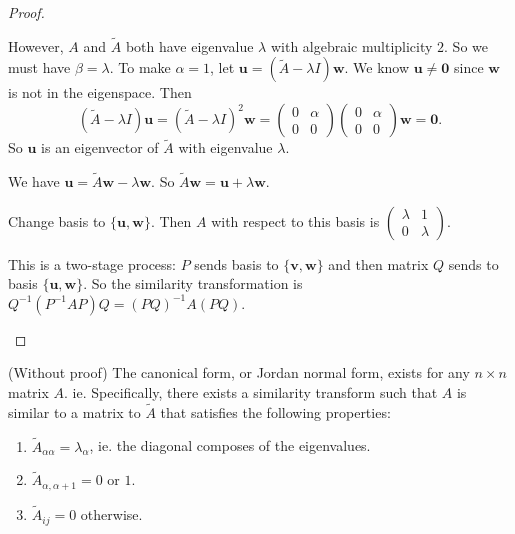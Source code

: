 \documentclass[a4paper]{article}
\begin{document}
\begin{proof}
\begin{enumerate}
      However, $A$ and $\tilde{A}$ both have eigenvalue $\lambda$ with algebraic multiplicity $2$. So we must have $\beta = \lambda$. To make $\alpha = 1$, let $\mathbf{u} = (\tilde{A} - \lambda I)\mathbf{w}$. We know $\mathbf{u}\not= \mathbf{0}$ since $\mathbf{w}$ is not in the eigenspace. Then
      \[
        (\tilde{A} - \lambda I)\mathbf{u} = (\tilde{A} - \lambda I)^2 \mathbf{w} =
        \begin{pmatrix}
          0 & \alpha\\
          0 & 0
        \end{pmatrix}
        \begin{pmatrix}
          0 & \alpha\\
          0 & 0
        \end{pmatrix}\mathbf{w} = \mathbf{0}.
      \]
      So $\mathbf{u}$ is an eigenvector of $\tilde{A}$ with eigenvalue $\lambda$.

      We have $\mathbf{u} = \tilde A\mathbf{w} - \lambda\mathbf{w}$. So $\tilde A\mathbf{w} = \mathbf{u} + \lambda\mathbf{w}$.

      Change basis to $\{\mathbf{u}, \mathbf{w}\}$. Then $A$ with respect to this basis is $
      \begin{pmatrix}
        \lambda & 1\\
        0 & \lambda
      \end{pmatrix}$.

      This is a two-stage process: $P$ sends basis to $\{\mathbf{v}, \mathbf{w}\}$ and then matrix $Q$ sends to basis $\{\mathbf{u}, \mathbf{w}\}$. So the similarity transformation is $Q^{-1}(P^{-1}AP)Q = (PQ)^{-1}A(PQ)$.
  \end{enumerate}
\end{proof}

\begin{prop}
  (Without proof) The canonical form, or Jordan normal form, exists for any $n\times n$ matrix $A$. ie. Specifically, there exists a similarity transform such that $A$ is similar to a matrix to $\tilde{A}$ that satisfies the following properties:
  \begin{enumerate}
    \item $\tilde{A}_{\alpha\alpha} = \lambda_\alpha$, ie. the diagonal composes of the eigenvalues.
    \item $\tilde{A}_{\alpha, \alpha + 1} = 0$ or $1$.
    \item $\tilde{A}_{ij} = 0$ otherwise.
  \end{enumerate}
\end{prop}
\end{document}
